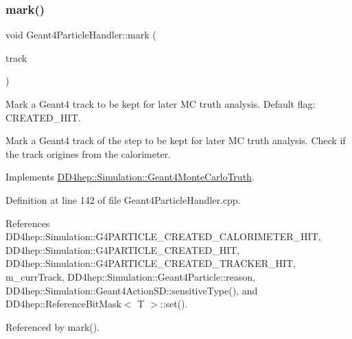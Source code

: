 \subsubsection{\texorpdfstring{mark()}{mark()}\hspace{0.1cm}{\footnotesize\ttfamily [1/4]}}
{\footnotesize\ttfamily void Geant4\+Particle\+Handler\+::mark (\begin{DoxyParamCaption}\item[{const G4\+Track $\ast$}]{track }\end{DoxyParamCaption})\hspace{0.3cm}{\ttfamily [virtual]}}



Mark a Geant4 track to be kept for later MC truth analysis. Default flag\+: C\+R\+E\+A\+T\+E\+D\+\_\+\+H\+IT. 

Mark a Geant4 track of the step to be kept for later MC truth analysis. Check if the track origines from the calorimeter. 

Implements \hyperlink{class_d_d4hep_1_1_simulation_1_1_geant4_monte_carlo_truth_ad74253c38fb6e00003b591a07e5e748d}{D\+D4hep\+::\+Simulation\+::\+Geant4\+Monte\+Carlo\+Truth}.



Definition at line 142 of file Geant4\+Particle\+Handler.\+cpp.



References D\+D4hep\+::\+Simulation\+::\+G4\+P\+A\+R\+T\+I\+C\+L\+E\+\_\+\+C\+R\+E\+A\+T\+E\+D\+\_\+\+C\+A\+L\+O\+R\+I\+M\+E\+T\+E\+R\+\_\+\+H\+IT, D\+D4hep\+::\+Simulation\+::\+G4\+P\+A\+R\+T\+I\+C\+L\+E\+\_\+\+C\+R\+E\+A\+T\+E\+D\+\_\+\+H\+IT, D\+D4hep\+::\+Simulation\+::\+G4\+P\+A\+R\+T\+I\+C\+L\+E\+\_\+\+C\+R\+E\+A\+T\+E\+D\+\_\+\+T\+R\+A\+C\+K\+E\+R\+\_\+\+H\+IT, m\+\_\+curr\+Track, D\+D4hep\+::\+Simulation\+::\+Geant4\+Particle\+::reason, D\+D4hep\+::\+Simulation\+::\+Geant4\+Action\+S\+D\+::sensitive\+Type(), and D\+D4hep\+::\+Reference\+Bit\+Mask$<$ T $>$\+::set().



Referenced by mark().

\hypertarget{class_d_d4hep_1_1_simulation_1_1_geant4_particle_handler_a3ad0a4c70220326e76da4dd79c95501c}{}\label{class_d_d4hep_1_1_simulation_1_1_geant4_particle_handler_a3ad0a4c70220326e76da4dd79c95501c} 
